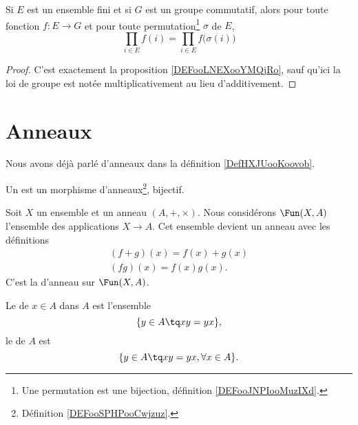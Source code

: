 \begin{proposition}     \label{PROPooQMUDooQQVRIe}
	Si \( E\) est un ensemble fini et si \( G\) est un groupe commutatif, alors pour toute fonction \( f\colon E\to G\) et pour toute permutation\footnote{Une permutation est une bijection, définition \ref{DEFooJNPIooMuzIXd}.} \( \sigma\) de \( E\),
	\begin{equation}
		\prod_{i\in E}f(i)=\prod_{i\in E}f\big( \sigma(i) \big)
	\end{equation}
\end{proposition}

\begin{proof}
	C'est exactement la proposition \ref{DEFooLNEXooYMQjRo}, sauf qu'ici la loi de groupe est notée multiplicativement au lieu d'additivement.
\end{proof}



\section{Anneaux}

Nous avons déjà parlé d'anneaux dans la définition \ref{DefHXJUooKoovob}.

\begin{definition}      \label{DEFooKWKGooIOwGTA}
	Un  est un morphisme d'anneaux\footnote{Définition \ref{DEFooSPHPooCwjzuz}.}, bijectif.
\end{definition}

Soit \( X\) un ensemble et un anneau \( (A, +, \times)\). Nous considérons \( \Fun(X,A)\) l'ensemble des applications \( X\to A\). Cet ensemble devient un anneau avec les définitions
\begin{subequations}
	\begin{align}
		(f+g)(x)=f(x)+g(x) \\
		(fg)(x)=f(x)g(x).
	\end{align}
\end{subequations}
C'est la  d'anneau sur \( \Fun(X,A)\).

\begin{definition}
	Le  de \( x\in A\) dans \( A\) est l'ensemble
	\begin{equation}
		\{ y\in A\tq xy=yx \},
	\end{equation}
	le  de \( A\) est
	\begin{equation}
		\{ y\in A\tq xy=yx,\forall x\in A \}.
	\end{equation}
\end{definition}


